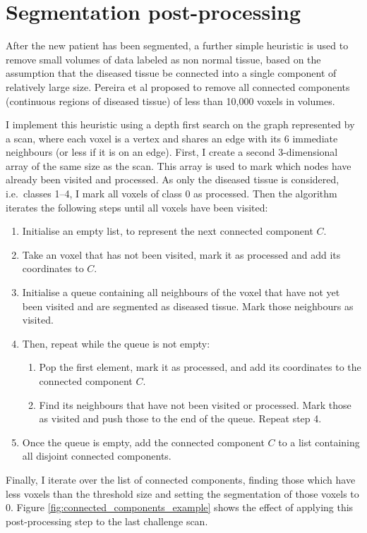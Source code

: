 \documentclass[12pt,a4paper,twoside,openright]{report}
\begin{document}
\section{Segmentation post-processing}
After the new patient has been segmented, a further simple heuristic is used to remove small volumes of data labeled as non normal tissue, based on the assumption that the diseased tissue be connected into a single component of relatively large size. Pereira et al \cite{pereira} proposed to remove all connected components (continuous regions of diseased tissue) of less than 10,000 voxels in volumes.

I implement this heuristic using a depth first search on the graph represented by a scan, where each voxel is a vertex and shares an edge with its 6 immediate neighbours (or less if it is on an edge). First, I create a second 3-dimensional array of the same size as the scan. This array is used to mark which nodes have already been visited and processed. As only the diseased tissue is considered, i.e.\ classes 1--4, I mark all voxels of class 0 as processed. Then the algorithm iterates the following steps until all voxels have been visited:
\begin{enumerate}
	\item Initialise an empty list, to represent the next connected component $C$.
	\item Take an voxel that has not been visited, mark it as processed and add its coordinates to $C$.
	\item Initialise a queue containing all neighbours of the voxel that have not yet been visited and are segmented as diseased tissue. Mark those neighbours as visited.
	\item Then, repeat while the queue is not empty:
	\begin{enumerate}
		\item Pop the first element, mark it as processed, and add its coordinates to the connected component $C$.
		\item Find its neighbours that have not been visited or processed. Mark those as visited and push those to the end of the queue. Repeat step 4.
	\end{enumerate}
	\item Once the queue is empty, add the connected component $C$ to a list containing all disjoint connected components.
\end{enumerate}
Finally, I iterate over the list of connected components, finding those which have less voxels than the threshold size and setting the segmentation of those voxels to 0. Figure \ref{fig:connected_components_example} shows the effect of applying this post-processing step to the last challenge scan.
\end{document}
